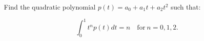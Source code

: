 Find the quadratic polynomial $p(t) = a_0 + a_1 t + a_2 t^2$ such that:

$$ \int_0^1 t^n p(t) dt = n \quad \textrm{for} \ n = 0, 1, 2. $$
